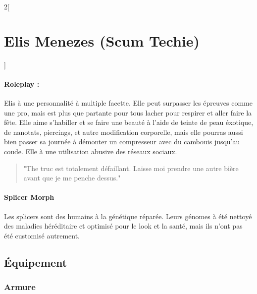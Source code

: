 \documentclass[a4paper,9pt]{article}
\begin{document}
\begin{multicols}{2}[\section*{Elis Menezes (Scum Techie)}]
   \paragraph{Roleplay :}
   Elis à une personnalité à multiple facette.
   Elle peut surpasser les épreuves comme une pro, mais est plus que partante
   pour tous lacher pour respirer et aller faire la fête.
   Elle aime s'habiller et se faire une beauté à l'aide de teinte de peau
   éxotique, de nanotats, piercings, et autre modification corporelle, mais
   elle pourras aussi bien passer sa journée à démonter un compresseur avec
   du cambouis jusqu'au coude.
   Elle à une utilisation abusive des réseaux sociaux.

   \begin{quote}
      "The truc est totalement défaillant. Laisse moi prendre une autre bière
      avant que je me penche dessus."
   \end{quote}

   \paragraph{Splicer Morph}
   Les splicers sont des humains à la génétique réparée.
   Leurs génomes à été nettoyé des maladies héréditaire et optimisé pour le
   look et la santé, mais ils n'ont pas été customisé autrement.

   \subsection*{Équipement}

   \subsubsection*{Armure}


\end{multicols}
\end{document}
